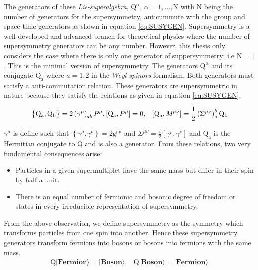 \newline
The generators of these \textit{Lie-superalgebra}, $\mathrm{Q^{\alpha}}$, $\alpha = 1,...,\mathrm{N}$ with $\mathrm{N}$ being the number of generators for the supersymmetry, anticummute with the group and space-time generators as shown in equation \ref{eq:SUSYGEN}. 
Supersymmetry is a well developed and advanced branch for theoretical physics where the number of supersymmetry generators can be any number. However, this thesis only considers the case where there is only one generator of suppersymmetry; i.e $\mathrm{N} = 1$. This is the minimal  version of supersymmetry. 
 The generators $\mathrm{Q^{\alpha}}$ and its conjugate $\mathrm{Q_{a}}$ where $a=1,2$ in the  \textit{Weyl spinors} formalism. Both generators must satisfy  a anti-commutation relation.
These generators are supersymmetric in nature because they satisfy the relations as given in equation \ref{eq:SUSYGEN}.

\begin{eqnarray}{\label{SUSYGEN}}
\left\lbrace\mathrm{Q_{a}}, \mathrm{\bar{Q}_{b}}\right\rbrace =  2\left(\gamma^{\mu}\right)_{ab}P^{\mu}, &
\left[\mathrm{Q_{a}},P^{\mu}\right] = 0, &
\left[\mathrm{Q_{a}}, M^{\mu\nu}\right] =\frac{1}{2}\left(\Sigma^{\mu\nu}\right)_{a}^{b}\mathrm{Q_{b}}
\end{eqnarray}

$\gamma^{\mu}$ is define such that $\left\lbrace \gamma^{\mu}, \gamma^{\nu}\right\rbrace = 2\mathrm{g^{\mu\nu}}$ and  $\Sigma^{\mu\nu} = \frac{i}{2}\left[\gamma^{\mu},\gamma^{\nu}\right]$ and $\mathrm{\bar{Q}_{a}}$ 
is the Hermitian conjugate to $\mathrm{Q}$ and is also a generator.
From these relations, two very fundamental consequences arise:
\begin{itemize}
\item  Particles in a given supermultiplet have the same mass but differ in their spin by half a unit.
\item There is an equal number of fermionic and bosonic degree of freedom or states in every irreducible representation of supersymmetry. 
\end{itemize}
From the above observation, we define supersymmetry as the symmetry which transforms particles from one spin into another.  Hence these supersymmetry generators transform fermions into bosons or bosons into fermions with the same mass.\begin{eqnarray}
\mathrm{Q}|\textbf{Fermion}\rangle =|\textbf{Boson}\rangle,    &
\mathrm{Q}|\textbf{Boson}\rangle  =|\textbf{Fermion} \rangle 
\end{eqnarray}

